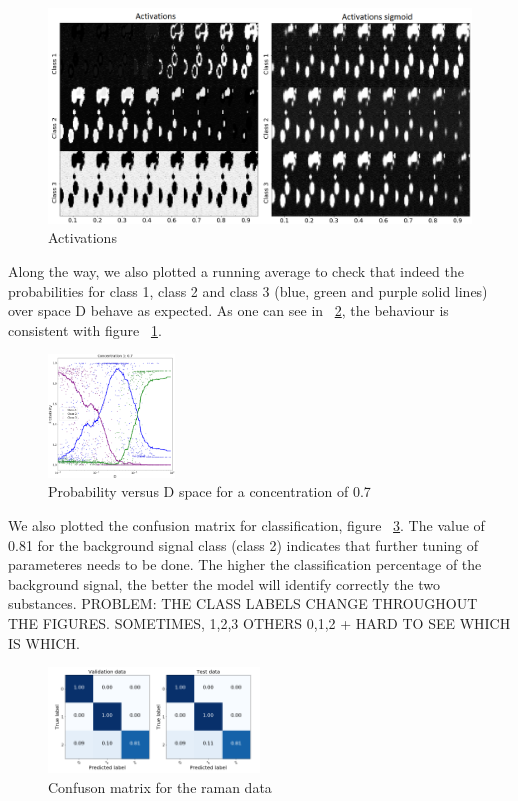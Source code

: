 \documentclass{article}
\begin{document}
\begin{figure}[H]
  \includegraphics[width=1\linewidth]{figures_3/DNN_prop_sigmoid_im.png}
  \caption{Activations}
    \label{fig:activations}
\end{figure}
Along the way, we also plotted a running average to check that indeed the probabilities for class 1, class 2 and class 3 (blue, green and purple solid lines) over space D behave as expected. As one can see in ~\ref{fig:Dspace}, the behaviour is consistent with figure ~\ref{fig:activations}.
\begin{figure}[H]
	\centering
	\includegraphics[width=0.3\textwidth]{figures_3/DNN_D_vs_prob_6.png}
	\caption{Probability versus D space for a concentration of 0.7}
	\label{fig:Dspace}
\end{figure}
We also plotted the confusion matrix for classification, figure ~\ref{fig:confusion}. The value of 0.81 for the background signal class (class 2) indicates that further tuning of parameteres needs to be done. The higher the classification percentage of the background signal, the better the model will identify correctly the two substances. PROBLEM: THE CLASS LABELS CHANGE THROUGHOUT THE FIGURES. SOMETIMES, 1,2,3 OTHERS 0,1,2 + HARD TO SEE WHICH IS WHICH.
\begin{figure}[H]
  \centering
  \includegraphics[width=0.5\textwidth]{figures_2/raman_sim_3_conf_matrix13.png}
  \caption{Confuson matrix for the raman data}
  \label{fig:confusion}
\end{figure}
\end{document}

